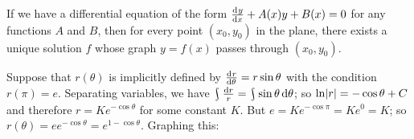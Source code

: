 If we have a differential equation of the form $ \od{y}{x} + A(x)y + B(x) = 0 $ for any functions $ A $ and $ B $, then for
every point $ (x_0,y_0) $ in the plane, there exists a unique solution $ f $ whose graph $ y = f(x) $ passes through $ (x_0, y_0) $.

  \clearpage
\begin{ex}
  Suppose that $ r(\theta) $ is implicitly defined by $ \od{r}{\theta} = r \sin \theta $ with the condition $ r(\pi) = e $.
  Separating variables, we have $ \rint \frac{\dif{r}}{r} = \rint \sin \theta \dif{\theta} $; so $ \ln \abs{r} = -\cos \theta + C $
  and therefore $ r = Ke^{-\cos \theta} $ for some constant $ K $. But $ e = Ke^{-\cos \pi} = Ke^0 = K $; so $ r(\theta) = e e^{-\cos \theta} = e^{1 - \cos \theta} $.
  Graphing this:
  \begin{center}
  \end{center}
\end{ex}

